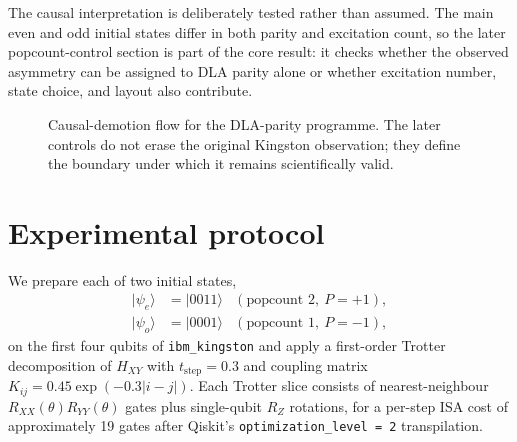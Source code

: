 \documentclass[reprint,aps,physrev,superscriptaddress,floatfix,longbibliography]{revtex4-2}
\begin{document}
The causal interpretation is deliberately tested rather than assumed.
The main even and odd initial states differ in both parity and
excitation count, so the later popcount-control section is part of the
core result: it checks whether the observed asymmetry can be assigned
to DLA parity alone or whether excitation number, state choice, and
layout also contribute.

\begin{figure}[tb]
\centering
{}
\caption{Causal-demotion flow for the DLA-parity programme. The later controls
do not erase the original Kingston observation; they define the boundary under
which it remains scientifically valid.}
\label{fig:causal-demotion}
\end{figure}

\section{Experimental protocol}
\label{sec:protocol}

We prepare each of two initial states,
%
\begin{align}
  |\psi_e\rangle &= |0011\rangle & (\text{popcount } 2,\ P = +1), \\
  |\psi_o\rangle &= |0001\rangle & (\text{popcount } 1,\ P = -1),
\end{align}
%
on the first four qubits of \texttt{ibm\_kingston} and apply a
first-order Trotter decomposition of $H_{XY}$ with
$t_\text{step} = 0.3$ and coupling matrix
$K_{ij} = 0.45 \exp(-0.3 |i - j|)$. Each Trotter slice consists of
nearest-neighbour $R_{XX}(\theta) R_{YY}(\theta)$ gates plus
single-qubit $R_Z$ rotations, for a per-step ISA cost of
approximately 19 gates after Qiskit's \texttt{optimization\_level = 2}
transpilation.
\end{document}
